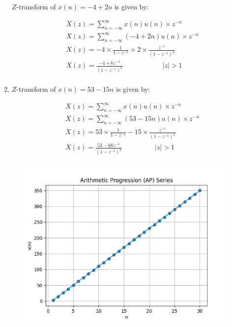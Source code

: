 \documentclass[journal,12pt,twocolumn]{IEEEtran}
\theoremstyle{remark}
\begin{document}
\begin{enumerate}
\vspace{2cm}
$Z$-transform of $x(n) = -4 + 2n$ is given by:

\begin{align}
       &X(z) = \sum_{n=-\infty}^{\infty} x(n) u(n)\times z^{-n} \\
       &X(z) = \sum_{n=-\infty}^{\infty} (-4 + 2n) u(n) \times z^{-n} \\
       &X(z)=-4 \times \frac{1}{1-{z^{-1}}}+ 2 \times \frac{z^{-1}}{(1-{z^{-1}})^2}\\
       &X(z)=\frac{-4+6{z^{-1}}}{(1-{z^{-1}})^2} \hspace{2cm}\quad  |z|>1\\
\end{align}
\item 
$Z$-transform of $x(n) = 53 - 15n$ is given by:

\begin{align}
       &X(z) = \sum_{n=-\infty}^{\infty} x(n) u(n)\times z^{-n} \\
       &X(z) = \sum_{n=-\infty}^{\infty} (53 - 15n) u(n) \times z^{-n} \\
       &X(z)=53 \times \frac{1}{1-{z^{-1}}}- 15 \times \frac{z^{-1}}{(1-{z^{-1}})^2}\\
       &X(z)=\frac{53-68{z^{-1}}}{(1-{z^{-1}})^2} \hspace{2cm}  |z|>1\\
\end{align}
\end{enumerate}

\begin{figure}[h]
       \vspace*{-1cm}
       \centering
        \includegraphics[width=0.8\linewidth]{figures/download.png} %
        \caption{}
   \label{fig:your_label}
\end{figure}
\end{document}
